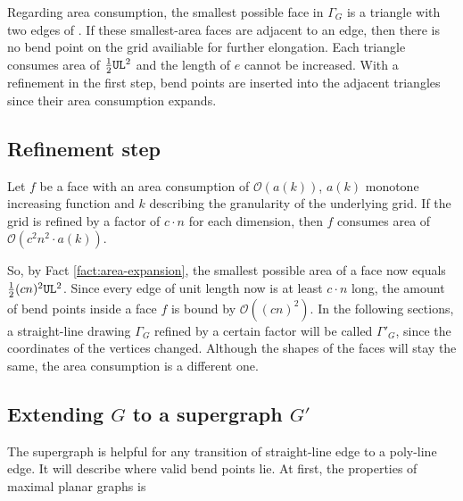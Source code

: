 \bigskip
Regarding area consumption, the smallest possible face in $\Gamma_G$ is a triangle with two edges of \UL. If these smallest-area faces are adjacent to an edge, then there is no bend point on the grid availiable for further elongation. Each triangle consumes area of $\frac{1}{2}\texttt{UL}^2$ and the length of $e$ cannot be increased.
With a refinement in the first step, bend points are inserted into the adjacent triangles since their area consumption expands.



\subsection{Refinement step}
\begin{fact}\label{fact:area-expansion}
\end{fact}
Let $f$ be a face with an area consumption of $\mathcal{O}(a(k))$, $a(k)$ monotone increasing function and $k$ describing the granularity of the underlying grid. If the grid is refined by a factor of $c\cdot n$ for each dimension, then $f$ consumes area of $\mathcal{O}(c^2n^2 \cdot a(k))$.

\bigskip
So, by Fact \ref{fact:area-expansion}, the smallest possible area of a face now equals $\frac{1}{2}(cn)^2\texttt{UL}^2$. Since every edge of unit length now is at least $c \cdot n$ long, the amount of bend points inside a face $f$ is bound by $\mathcal{O}((cn)^2)$. 
In the following sections, a straight-line drawing $\Gamma_G$ refined by a certain factor will be called $\Gamma'_G$, since the coordinates of the vertices changed. Although the shapes of the faces will stay the same, the area consumption is a different one.


\subsection{Extending $G$ to a supergraph $G'$}
The supergraph is helpful for any transition of straight-line edge to a poly-line edge. It will describe where valid bend points lie. At first, the properties of maximal planar graphs is 

